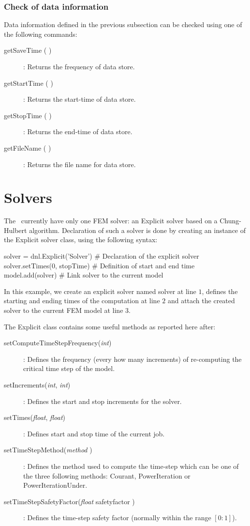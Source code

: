 \subsubsection{Check of data information}
Data information defined in the previous subsection can be checked using one of the following commands:
\begin{description}
\item [{getSaveTime ( )}] : Returns the frequency of data store.
\item [{getStartTime ( )}] : Returns the start-time of data store. 
\item [{getStopTime ( )}] : Returns the end-time of data store.
\item [{getFileName ( )}] : Returns the file name for data store.
\end{description}

\section{Solvers}
The \DynELA~currently have only one FEM solver: an Explicit solver based on a Chung-Hulbert algorithm. Declaration of such a solver is done by creating an instance of the \textsf{Explicit} solver class, using the following syntax:
\begin{PythonListing}
solver = dnl.Explicit('Solver') # Declaration of the explicit solver
solver.setTimes(0, stopTime)    # Definition of start and end time
model.add(solver)               # Link solver to the current model
\end{PythonListing}
In this example, we create an explicit solver named solver at line $1$, defines the starting and ending times of the computation at line $2$ and attach the created solver to the current FEM model at line $3$.

The Explicit class contains some useful methods as reported here after:
\begin{description}
\item [{setComputeTimeStepFrequency(\emph{int})}] : Defines the frequency (\ie every how many increments) of re-computing the critical time step of the model.
\item [{setIncrements(\emph{int}, \emph{int})}] : Defines the start and stop increments for the solver.
\item [{setTimes(\emph{float}, \emph{float})}] : Defines start and stop time of the current job.
\item [{setTimeStepMethod(\emph{method} )}] : Defines the method used to compute the time-step which can be one of the three following methods: \textsf{Courant}, \textsf{PowerIteration} or \textsf{PowerIterationUnder}.
\item [{setTimeStepSafetyFactor(\emph{float} safetyfactor )}] : Defines the time-step safety factor (normally within the range  $[0:1]$).
\end{description}


